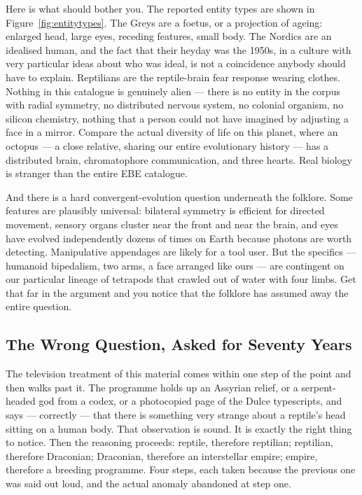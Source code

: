 Here is what should bother you. 
The reported entity types are shown in Figure~\ref{fig:entitytypes}. The Greys are a foetus, or a projection of ageing: enlarged head, large eyes, receding
features, small body. The Nordics are an idealised human, and the fact that their heyday was
the 1950s, in a culture with very particular ideas about who was ideal, is not a coincidence
anybody should have to explain. Reptilians are the reptile-brain fear response wearing
clothes. Nothing in this catalogue is genuinely alien --- there is no entity in the corpus
with radial symmetry, no distributed nervous system, no colonial organism, no silicon
chemistry, nothing that a person could not have imagined by adjusting a face in a mirror.
Compare the actual diversity of life on this planet, where an octopus --- a close relative,
sharing our entire evolutionary history --- has a distributed brain, chromatophore
communication, and three hearts. Real biology is stranger than the entire EBE catalogue.

And there is a hard convergent-evolution question underneath the folklore. Some features are
plausibly universal: bilateral symmetry is efficient for directed movement, sensory organs
cluster near the front and near the brain, and eyes have evolved independently dozens of
times on Earth because photons are worth detecting. Manipulative appendages are likely for a
tool user. But the specifics --- humanoid bipedalism, two arms, a face arranged like ours ---
are contingent on our particular lineage of tetrapods that crawled out of water with four
limbs. Get that far in the argument and you notice that the folklore has assumed away the
entire question.

\subsection{The Wrong Question, Asked for Seventy Years}\label{sec:wrongquestion}

The television treatment of this material comes within one step of the point and then walks
past it. The programme holds up an Assyrian relief, or a serpent-headed god from a codex, or a
photocopied page of the Dulce typescripts, and says --- correctly --- that there is something
very strange about a reptile's head sitting on a human body. That observation is sound. It is
exactly the right thing to notice. Then the reasoning proceeds: reptile, therefore reptilian;
reptilian, therefore Draconian; Draconian, therefore an interstellar empire; empire, therefore
a breeding programme. Four steps, each taken because the previous one was said out loud, and
the actual anomaly abandoned at step one.

